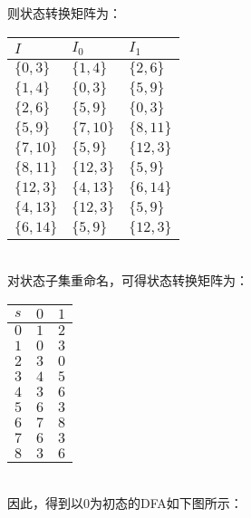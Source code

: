 \documentclass{article}
\begin{document}
则状态转换矩阵为：
\begin{table}[h]
    \centering
\begin{tabular}{|p{3cm}<{\centering}|p{3cm}<{\centering}|p{3cm}<{\centering}|}   
    \hline
    $I$ & $I_0$ & $I_1$ \\
    \hline
    $\{0,3\}$ & $\{1,4\}$ & $\{2,6\}$ \\
    \hline
    $\{1,4\}$ & $\{0,3\}$ & $\{5,9\}$ \\
    \hline
    $\{2,6\}$ & $\{5,9\}$ & $\{0,3\}$ \\
    \hline
    $\{5,9\}$ & $\{7,10\}$ & $\{8,11\}$ \\
    \hline
    $\{7,10\}$ & $\{5,9\}$ & $\{12,3\}$ \\
    \hline
    $\{8,11\}$ & $\{12,3\}$ & $\{5,9\}$ \\
    \hline
    $\{12,3\}$ & $\{4,13\}$ & $\{6,14\}$ \\
    \hline
    $\{4,13\}$ & $\{12,3\}$ & $\{5,9\}$ \\
    \hline
    $\{6,14\}$ & $\{5,9\}$ & $\{12,3\}$ \\
    \hline
\end{tabular}
\end{table}
\ \\
对状态子集重命名，可得状态转换矩阵为：
\begin{table}[h]
    \centering

\begin{tabular}{|p{3cm}<{\centering}|p{3cm}<{\centering}|p{3cm}<{\centering}|}   
    \hline
    $s$ & $0$ & $1$ \\
    \hline
    $0$ & $1$ & $2$ \\
    \hline
    $1$ & $0$ & $3$ \\
    \hline
    $2$ & $3$ & $0$ \\
    \hline
    $3$ & $4$ & $5$ \\
    \hline
    $4$ & $3$ & $6$ \\
    \hline
    $5$ & $6$ & $3$ \\
    \hline
    $6$ & $7$ & $8$ \\
    \hline
    $7$ & $6$ & $3$ \\
    \hline
    $8$ & $3$ & $6$ \\
    \hline
\end{tabular}
\end{table}
\ \\
因此，得到以0为初态的DFA如下图所示：
\end{document}
